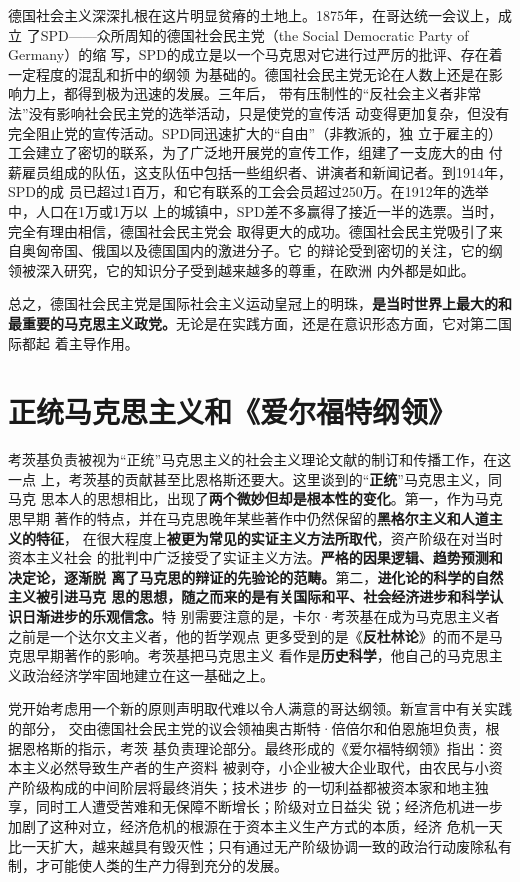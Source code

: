 德国社会主义深深扎根在这片明显贫瘠的土地上。1875年，在哥达统一会议上，成立
了SPD——众所周知的德国社会民主党（the Social Democratic Party of Germany）的缩
写，SPD的成立是以一个马克思对它进行过严厉的批评、存在着一定程度的混乱和折中的纲领
为基础的。德国社会民主党无论在人数上还是在影响力上，都得到极为迅速的发展。三年后，
带有压制性的“反社会主义者非常法”没有影响社会民主党的选举活动，只是使党的宣传活
动变得更加复杂，但没有完全阻止党的宣传活动。SPD同迅速扩大的“自由”（非教派的，独
立于雇主的）工会建立了密切的联系，为了广泛地开展党的宣传工作，组建了一支庞大的由
付薪雇员组成的队伍，这支队伍中包括一些组织者、讲演者和新闻记者。到1914年，SPD的成
员已超过1百万，和它有联系的工会会员超过250万。在1912年的选举中，人口在1万或1万以
上的城镇中，SPD差不多赢得了接近一半的选票。当时，完全有理由相信，德国社会民主党会
取得更大的成功。德国社会民主党吸引了来自奥匈帝国、俄国以及德国国内的激进分子。它
的辩论受到密切的关注，它的纲领被深入研究，它的知识分子受到越来越多的尊重，在欧洲
内外都是如此。

总之，德国社会民主党是国际社会主义运动皇冠上的明珠，\textbf{是当时世界上最大的和
  最重要的马克思主义政党。}无论是在实践方面，还是在意识形态方面，它对第二国际都起
着主导作用。

\section{正统马克思主义和《爱尔福特纲领》}

考茨基负责被视为“正统”马克思主义的社会主义理论文献的制订和传播工作，在这一点
上，考茨基的贡献甚至比恩格斯还要大。这里谈到的“\textbf{正统}”马克思主义，同马克
思本人的思想相比，出现了\textbf{两个微妙但却是根本性的变化}。第一，作为马克思早期
著作的特点，并在马克思晚年某些著作中仍然保留的\textbf{黑格尔主义和人道主义的特征}，
在很大程度上\textbf{被更为常见的实证主义方法所取代}，资产阶级在对当时资本主义社会
的批判中广泛接受了实证主义方法。\textbf{严格的因果逻辑、趋势预测和决定论，逐渐脱
  离了马克思的辩证的先验论的范畴。}第二，\textbf{进化论的科学的自然主义被引进马克
  思的思想，随之而来的是有关国际和平、社会经济进步和科学认识日渐进步的乐观信念。}特
别需要注意的是，卡尔·考茨基在成为马克思主义者之前是一个达尔文主义者，他的哲学观点
更多受到的是《\textbf{反杜林论}》的而不是马克思早期著作的影响。考茨基把马克思主义
看作是\textbf{历史科学}，他自己的马克思主义政治经济学牢固地建立在这一基础之上。

党开始考虑用一个新的原则声明取代难以令人满意的哥达纲领。新宣言中有关实践的部分，
交由德国社会民主党的议会领袖奥古斯特·倍倍尔和伯恩施坦负责，根据恩格斯的指示，考茨
基负责理论部分。最终形成的《爱尔福特纲领》指出：资本主义必然导致生产者的生产资料
被剥夺，小企业被大企业取代，由农民与小资产阶级构成的中间阶层将最终消失；技术进步
的一切利益都被资本家和地主独享，同时工人遭受苦难和无保障不断增长；阶级对立日益尖
锐；经济危机进一步加剧了这种对立，经济危机的根源在于资本主义生产方式的本质，经济
危机一天比一天扩大，越来越具有毁灭性；只有通过无产阶级协调一致的政治行动废除私有
制，才可能使人类的生产力得到充分的发展。

